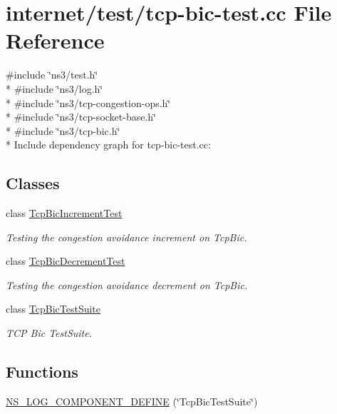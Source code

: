 \hypertarget{tcp-bic-test_8cc}{}\section{internet/test/tcp-\/bic-\/test.cc File Reference}
\label{tcp-bic-test_8cc}
{\ttfamily \#include \char`\"{}ns3/test.\+h\char`\"{}}\\*
{\ttfamily \#include \char`\"{}ns3/log.\+h\char`\"{}}\\*
{\ttfamily \#include \char`\"{}ns3/tcp-\/congestion-\/ops.\+h\char`\"{}}\\*
{\ttfamily \#include \char`\"{}ns3/tcp-\/socket-\/base.\+h\char`\"{}}\\*
{\ttfamily \#include \char`\"{}ns3/tcp-\/bic.\+h\char`\"{}}\\*
Include dependency graph for tcp-\/bic-\/test.cc\+:
\subsection*{Classes}
\begin{DoxyCompactItemize}
\item 
class \hyperlink{classTcpBicIncrementTest}{Tcp\+Bic\+Increment\+Test}
\begin{DoxyCompactList}\small\item\em Testing the congestion avoidance increment on Tcp\+Bic. \end{DoxyCompactList}\item 
class \hyperlink{classTcpBicDecrementTest}{Tcp\+Bic\+Decrement\+Test}
\begin{DoxyCompactList}\small\item\em Testing the congestion avoidance decrement on Tcp\+Bic. \end{DoxyCompactList}\item 
class \hyperlink{classTcpBicTestSuite}{Tcp\+Bic\+Test\+Suite}
\begin{DoxyCompactList}\small\item\em T\+CP Bic Test\+Suite. \end{DoxyCompactList}\end{DoxyCompactItemize}
\subsection*{Functions}
\begin{DoxyCompactItemize}
\item 
\hyperlink{tcp-bic-test_8cc_a15655d97d31837efcc70a0271b3ca829}{N\+S\+\_\+\+L\+O\+G\+\_\+\+C\+O\+M\+P\+O\+N\+E\+N\+T\+\_\+\+D\+E\+F\+I\+NE} (\char`\"{}Tcp\+Bic\+Test\+Suite\char`\"{})
\end{DoxyCompactItemize}
